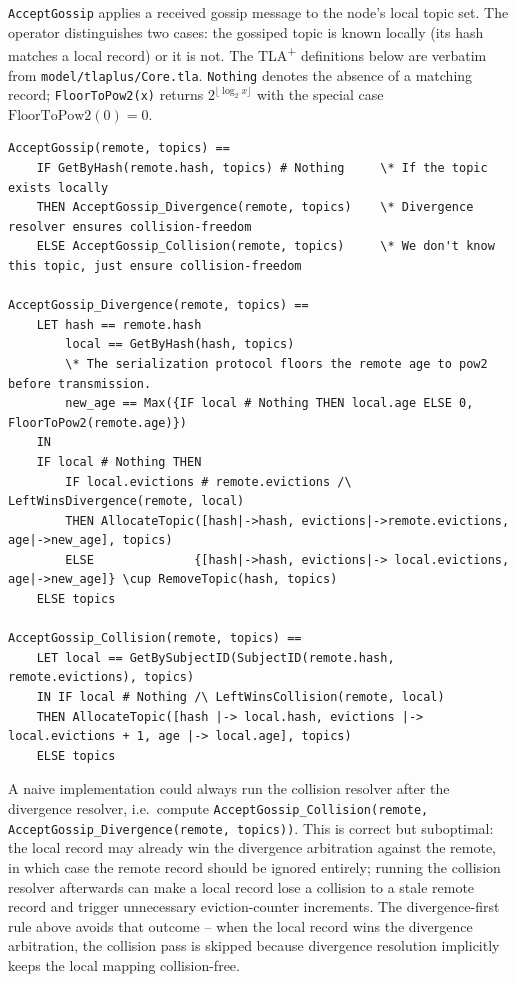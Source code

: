 \texttt{AcceptGossip} applies a received gossip message to the node's local topic
set. The operator distinguishes two cases: the gossiped topic is known locally
(its hash matches a local record) or it is not. The TLA\textsuperscript{+}
definitions below are verbatim from \texttt{model/tlaplus/Core.tla}.
\texttt{Nothing} denotes the absence of a matching record;
\texttt{FloorToPow2(x)} returns $2^{\lfloor \log_2 x \rfloor}$ with the
special case $\mathrm{FloorToPow2}(0) = 0$.

\begin{verbatim}
AcceptGossip(remote, topics) ==
    IF GetByHash(remote.hash, topics) # Nothing     \* If the topic exists locally
    THEN AcceptGossip_Divergence(remote, topics)    \* Divergence resolver ensures collision-freedom
    ELSE AcceptGossip_Collision(remote, topics)     \* We don't know this topic, just ensure collision-freedom

AcceptGossip_Divergence(remote, topics) ==
    LET hash == remote.hash
        local == GetByHash(hash, topics)
        \* The serialization protocol floors the remote age to pow2 before transmission.
        new_age == Max({IF local # Nothing THEN local.age ELSE 0, FloorToPow2(remote.age)})
    IN
    IF local # Nothing THEN
        IF local.evictions # remote.evictions /\ LeftWinsDivergence(remote, local)
        THEN AllocateTopic([hash|->hash, evictions|->remote.evictions, age|->new_age], topics)
        ELSE              {[hash|->hash, evictions|-> local.evictions, age|->new_age]} \cup RemoveTopic(hash, topics)
    ELSE topics

AcceptGossip_Collision(remote, topics) ==
    LET local == GetBySubjectID(SubjectID(remote.hash, remote.evictions), topics)
    IN IF local # Nothing /\ LeftWinsCollision(remote, local)
    THEN AllocateTopic([hash |-> local.hash, evictions |-> local.evictions + 1, age |-> local.age], topics)
    ELSE topics
\end{verbatim}

\begin{remark}[breakable]
    A naive implementation could always run the collision resolver after the
    divergence resolver, i.e.\ compute
    \texttt{AcceptGossip\_Collision(remote, AcceptGossip\_Divergence(remote, topics))}.
    This is correct but suboptimal: the local record may already win the
    divergence arbitration against the remote, in which case the remote record
    should be ignored entirely; running the collision resolver afterwards can make
    a local record lose a collision to a stale remote record and trigger
    unnecessary eviction-counter increments. The divergence-first rule above
    avoids that outcome -- when the local record wins the divergence arbitration,
    the collision pass is skipped because divergence resolution implicitly keeps
    the local mapping collision-free.
\end{remark}

